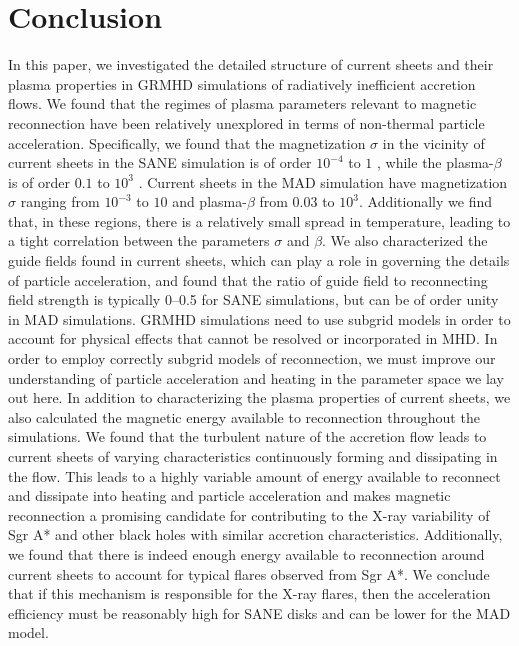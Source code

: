 \section{Conclusion}
In this paper, we investigated the detailed structure of
current sheets and their plasma properties in GRMHD
simulations of radiatively inefficient accretion flows. We
found that the regimes of plasma parameters relevant to
magnetic reconnection have been relatively unexplored
in terms of non-thermal particle acceleration. Specifically, we found that the magnetization $\sigma$ in the vicinity
of current sheets in the SANE simulation is of order $10^{-4}$
to $1$ , while the plasma-$\beta$ is of order $0.1$ to $10^3$
. Current sheets in the MAD simulation have magnetization
$\sigma$ ranging from $10^{-3}$
to $1$0 and plasma-$\beta$ from $0.03$ to
$10^3$. Additionally we find that, in these regions, there
is a relatively small spread in temperature, leading to a
tight correlation between the parameters $\sigma$ and $\beta$. We
also characterized the guide fields found in current sheets,
which can play a role in governing the details of particle
acceleration, and found that the ratio of guide field to
reconnecting field strength is typically 0–0.5 for SANE
simulations, but can be of order unity in MAD simulations.
GRMHD simulations need to use subgrid models in
order to account for physical effects that cannot be resolved or incorporated in MHD. In order to employ correctly subgrid models of reconnection, we must improve
our understanding of particle acceleration and heating in
the parameter space we lay out here.
In addition to characterizing the plasma properties of
current sheets, we also calculated the magnetic energy
available to reconnection throughout the simulations.
We found that the turbulent nature of the accretion flow
leads to current sheets of varying characteristics continuously forming and dissipating in the flow. This leads
to a highly variable amount of energy available to reconnect and dissipate into heating and particle acceleration
and makes magnetic reconnection a promising candidate
for contributing to the X-ray variability of Sgr A* and
other black holes with similar accretion characteristics.
Additionally, we found that there is indeed enough energy available to reconnection around current sheets to
account for typical flares observed from Sgr A*. We conclude that if this mechanism is responsible for the X-ray
flares, then the acceleration efficiency must be reasonably high for SANE disks and can be lower for the MAD
model.

